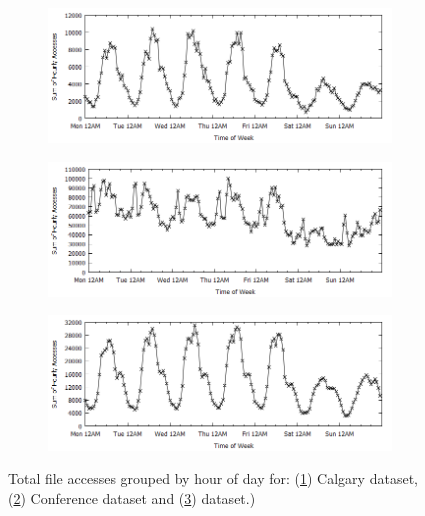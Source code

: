 \documentclass[10pt,conference]{IEEEtran}
\begin{document}
\begin{figure}
    \centering
    \begin{subfigure}{0.45\textwidth}
        \includegraphics[width=\textwidth]{images/calgarytime}
        \caption{}\label{fig:calgary}
    \end{subfigure}
\qquad
    \begin{subfigure}{0.45\textwidth}
        \includegraphics[width=\textwidth]{images/conferencetime}
        \caption{}\label{fig:conference}
    \end{subfigure}

    \begin{subfigure}{0.45\textwidth}
        \includegraphics[width=\textwidth]{images/usasktime}
        \caption{}\label{fig:usask}
    \end{subfigure}
    \caption{Total file accesses grouped by hour of day for: (\ref{fig:calgary}) Calgary dataset, (\ref{fig:conference}) Conference dataset and (\ref{fig:usask}) dataset.) }\label{fig:diurnal}
\end{figure}
\end{document}
